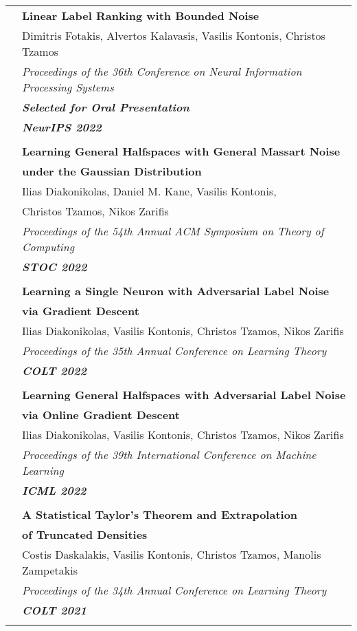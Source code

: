 \documentclass[letterpaper,11pt,oneside]{article}
\begin{document}
\begin{longtable}{@{} l l}
 &\textbf{Linear Label Ranking with Bounded Noise}\\
 &  Dimitris Fotakis, Alvertos Kalavasis, Vasilis Kontonis, Christos Tzamos \\
& \emph{Proceedings of the 36th Conference on Neural Information Processing Systems} \\
& \emph{\textbf{Selected for Oral Presentation}} \\
& \emph{\textbf{NeurIPS 2022}} \\
 & \\

 &\textbf{Learning General Halfspaces with General Massart Noise}\\
 & \textbf{under the Gaussian Distribution}\\
 & Ilias Diakonikolas, Daniel M. Kane, Vasilis Kontonis,\\
 & Christos Tzamos, Nikos Zarifis \\
 & \emph{Proceedings of the 54th Annual ACM Symposium on Theory of Computing}\\
 & \emph{\textbf{STOC 2022}} \\
 & \\


 &\textbf{Learning a Single Neuron with Adversarial Label Noise}\\
 & \textbf{via Gradient Descent}\\
 & Ilias Diakonikolas, Vasilis Kontonis, Christos Tzamos, Nikos Zarifis \\
 & \emph{Proceedings of the 35th Annual Conference on Learning Theory}\\
 & \emph{\textbf{COLT 2022}} \\
 & \\


 &\textbf{Learning General Halfspaces with Adversarial Label Noise}\\
 & \textbf{via Online Gradient Descent}\\
 & Ilias Diakonikolas, Vasilis Kontonis, Christos Tzamos, Nikos Zarifis \\
 & \emph{Proceedings of the 39th International Conference on Machine Learning} \\
 & \emph{\textbf{ICML 2022}} \\
 & \\


 &\textbf{A Statistical Taylor's Theorem and Extrapolation}\\
 & \textbf{of Truncated Densities}\\
 & Costis Daskalakis, Vasilis Kontonis, Christos Tzamos, Manolis Zampetakis \\
 & \emph{Proceedings of the 34th Annual Conference on Learning Theory} \\
 & \emph{\textbf{COLT 2021}} \\
 & \\


\end{longtable}
\end{document}
